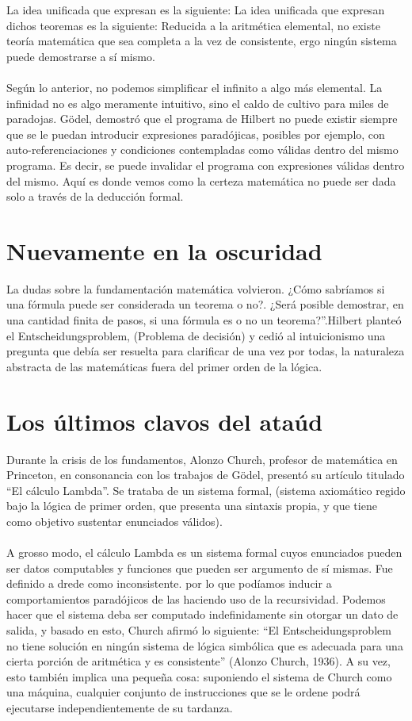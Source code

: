 \documentclass[12pt]{article}
\begin{document}
\begin{multicols}{2}
\indent La idea unificada que expresan es la siguiente: 
La idea unificada que expresan dichos teoremas es la siguiente: Reducida a la aritmética elemental, no existe teoría matemática que sea completa a la vez de consistente, ergo ningún sistema puede demostrarse a sí mismo.\\\\
\indent Según lo anterior, no podemos simplificar el infinito a algo más elemental. La infinidad no es algo meramente intuitivo, sino el caldo de cultivo para miles de paradojas. Gödel, demostró que el programa de Hilbert no puede existir siempre que se le puedan introducir expresiones paradójicas, posibles por ejemplo, con auto-referenciaciones y condiciones contempladas como válidas dentro del mismo programa. Es decir, se puede invalidar el programa con expresiones válidas dentro del mismo. Aquí es donde vemos como la certeza matemática no puede ser dada solo a través de la deducción formal.
\section*{Nuevamente en la oscuridad}
 La dudas sobre la fundamentación matemática volvieron. ¿Cómo sabríamos si una fórmula puede ser considerada un teorema o no?. ¿Será posible demostrar, en una cantidad finita de pasos, si una fórmula es o no un teorema?”.Hilbert planteó el Entscheidungsproblem\cite{MT}, (Problema de decisión) y cedió al intuicionismo una pregunta que debía ser resuelta para clarificar de una vez por todas, la naturaleza abstracta de las matemáticas fuera del primer orden de la lógica.
\section*{Los últimos clavos del ataúd}
Durante la crisis de los fundamentos, Alonzo Church, profesor de matemática en Princeton, en consonancia con los trabajos de Gödel, presentó su artículo titulado “El cálculo Lambda”. Se trataba de un sistema formal, (sistema axiomático regido bajo la lógica de primer orden, que presenta una sintaxis propia, y que tiene como objetivo sustentar enunciados válidos)\cite{Hut}.\\\\
\indent A grosso modo, el cálculo Lambda es un sistema formal cuyos enunciados pueden ser datos computables y funciones que pueden ser argumento de sí mismas. Fue definido a drede como inconsistente. por lo que podíamos inducir a comportamientos paradójicos de las haciendo uso de la recursividad. Podemos hacer que el sistema deba ser computado indefinidamente sin otorgar un dato de salida, y basado en esto, Church afirmó lo siguiente: “El Entscheidungsproblem no tiene solución en ningún sistema de lógica simbólica que es adecuada para una cierta porción de aritmética y es consistente” (Alonzo Church, 1936). A su vez, esto también implica una pequeña cosa: suponiendo el sistema de Church como una máquina, cualquier conjunto de instrucciones que se le ordene podrá ejecutarse independientemente de su tardanza.

\end{multicols}
\end{document}
